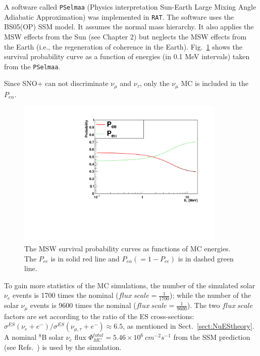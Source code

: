 A software called \texttt{PSelmaa} (Physics interpretation Sun-Earth Large Mixing Angle Adiabatic
Approximation) was implemented in \texttt{RAT}\cite{fady_pselmaa}. The software uses the BS05(OP) SSM model. It assumes the normal mass hierarchy. It also applies the MSW effects from the Sun (see Chapter 2) but neglects the MSW effects from the Earth (i.e., the regeneration of coherence in the Earth). Fig.~\ref{fig:pselmaa_curves} shows the survival probability curve as a function of energies (in 0.1 MeV intervals) taken from the \texttt{PSelmaa}.

Since SNO+ can not discriminate $\nu_\mu$ and $\nu_\tau$, only the $\nu_\mu$ MC is included in the $P_{e\alpha}$.

\begin{figure}[!htb]
	\centering
	\includegraphics[width=10cm]{PSelmaa_bs05op.pdf}
	\caption[The MSW survival probability curves as functions of MC energies.]{The MSW survival probability curves as functions of MC energies. The $P_{ee}$ is in solid red line and $P_{e\alpha}(=1-P_{ee})$ is in dashed green line.}
	\label{fig:pselmaa_curves}
\end{figure}

To gain more statistics of the MC simulations, the number of the simulated solar $\nu_e$ events is 1700 times the nominal ($flux~scale = \frac{1}{1700}$); while the number of the solar $\nu_\mu$ events is 9600 times the nominal ($flux~scale=\frac{1}{9600}$). The two $flux~scale$ factors are set according to the ratio of the ES cross-sections: $\sigma^{ES}(\nu_{e}+e^-)/\sigma^{ES}(\nu_{\mu,\tau}+e^-)\approx 6.5$, as mentioned in Sect.~\ref{sect:NuEStheory}. A nominal $^8$B solar $\nu_e$ flux $\Phi^{total}_{MC}=5.46\times 10^6~cm^{-2}s^{-1}$ from the SSM prediction (see Refs.~\cite{vinyoles2017new,pdg2020}) is used by the simulation.


